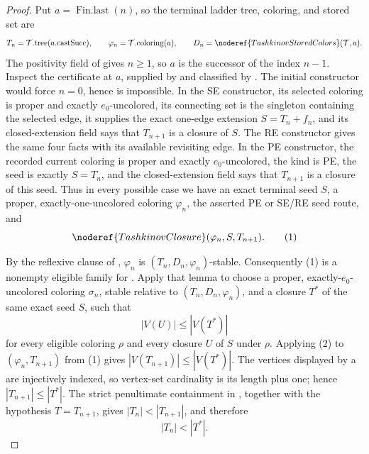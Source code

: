 \begin{proof}
Put \(a=\operatorname{Fin.last}(n)\), so the terminal ladder tree,
coloring, and stored set are
\[
 T_n=\mathcal T.\mathrm{tree}(a.\mathrm{castSucc}),\qquad
 \varphi_n=\mathcal T.\mathrm{coloring}(a),\qquad
 D_n=\noderef{TashkinovStoredColors}(\mathcal T,a).
\]
The positivity field of  gives \(n\geq1\),
so \(a\) is the successor of the index \(n-1\).  Inspect the certificate
at \(a\), supplied by  and classified by
.  The initial constructor would force
\(n=0\), hence is impossible.  In the SE constructor, its selected
coloring is proper and exactly \(e_0\)-uncolored, its connecting set is
the singleton containing the selected edge, it supplies the exact
one-edge extension \(S=T_n+f_n\), and its closed-extension field says
that \(T_{n+1}\) is a closure of \(S\).  The RE constructor gives the
same four facts with its available revisiting edge.  In the PE constructor,
the recorded current coloring is proper and exactly \(e_0\)-uncolored,
the kind is PE, the seed is exactly \(S=T_n\), and the closed-extension
field says that \(T_{n+1}\) is a closure of this seed.  Thus in every
possible case we have an exact terminal seed \(S\), a proper,
exactly-one-uncolored coloring \(\varphi_n\), the asserted PE or SE/RE
seed route, and
\[
                 \noderef{TashkinovClosure}(\varphi_n,S,T_{n+1}). \tag{1}
\]

By the reflexive clause of , \(\varphi_n\) is
\((T_n,D_n,\varphi_n)\)-stable.  Consequently (1) is a nonempty eligible
family for .  Apply that lemma to
choose a proper, exactly-\(e_0\)-uncolored coloring \(\sigma_n\), stable
relative to \((T_n,D_n,\varphi_n)\), and a closure \(T^*\) of the same
exact seed \(S\), such that
\[
 |V(U)|\leq |V(T^*)|                                           \tag{2}
\]
for every eligible coloring \(\rho\) and every closure \(U\) of \(S\)
under \(\rho\).  Applying (2) to \((\varphi_n,T_{n+1})\) from (1) gives
\(|V(T_{n+1})|\leq |V(T^*)|\).  The vertices displayed by a
 are injectively indexed, so vertex-set cardinality
is its length plus one; hence
\(|T_{n+1}|\leq |T^*|\).  The strict penultimate containment in
, together with the hypothesis
\(T=T_{n+1}\), gives \(|T_n|<|T_{n+1}|\), and therefore
\[
                             |T_n|<|T^*|.                       \tag{3}
\]


\end{proof}
